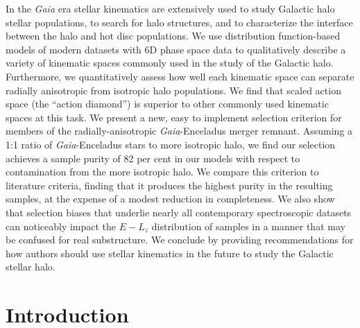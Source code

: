 In the \textit{Gaia} era stellar kinematics are extensively used to study Galactic halo stellar populations, to search for halo structures, and to characterize the interface between the halo and hot disc populations. We use distribution function-based models of modern datasets with 6D phase space data to qualitatively describe a variety of kinematic spaces commonly used in the study of the Galactic halo. Furthermore, we quantitatively assess how well each kinematic space can separate radially anisotropic from isotropic halo populations. We find that scaled action space (the ``action diamond'') is superior to other commonly used kinematic spaces at this task. We present a new, easy to implement selection criterion for members of the radially-anisotropic \textit{Gaia}-Enceladus merger remnant. Assuming a 1:1 ratio of \textit{Gaia}-Enceladus stars to more isotropic halo, we find our selection achieves a sample purity of 82 per cent in our models with respect to contamination from the more isotropic halo. We compare this criterion to literature criteria, finding that it produces the highest purity in the resulting samples, at the expense of a modest reduction in completeness. We also show that selection biases that underlie nearly all contemporary spectroscopic datasets can noticeably impact the $E-L_{z}$ distribution of samples in a manner that may be confused for real substructure. We conclude by providing recommendations for how authors should use stellar kinematics in the future to study the Galactic stellar halo. 




\section{Introduction}
\label{ch2:sec:Introduction}


